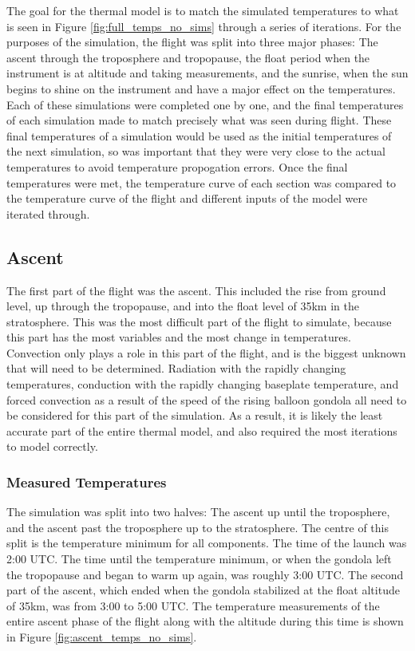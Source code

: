 The goal for the thermal model is to match the simulated temperatures to what is seen in Figure \ref{fig:full_temps_no_sims} through a series of iterations. For the purposes of the simulation, the flight was split into three major phases: The ascent through the troposphere and tropopause, the float period when the instrument is at altitude and taking measurements, and the sunrise, when the sun begins to shine on the instrument and have a major effect on the temperatures. Each of these simulations were completed one by one, and the final temperatures of each simulation made to match precisely what was seen during flight. These final temperatures of a simulation would be used as the initial temperatures of the next simulation, so was important that they were very close to the actual temperatures to avoid temperature propogation errors. Once the final temperatures were met, the temperature curve of each section was compared to the temperature curve of the flight and different inputs of the model were iterated through.

\subsection{Ascent}\label{ascent}
The first part of the flight was the ascent. This included the rise from ground level, up through the tropopause, and into the float level of 35km in the stratosphere. This was the most difficult part of the flight to simulate, because this part has the most variables and the most change in temperatures. Convection only plays a role in this part of the flight, and is the biggest unknown that will need to be determined. Radiation with the rapidly changing temperatures, conduction with the rapidly changing baseplate temperature, and forced convection as a result of the speed of the rising balloon gondola all need to be considered for this part of the simulation. As a result, it is likely the least accurate part of the entire thermal model, and also required the most iterations to model correctly.

\subsubsection{Measured Temperatures}
The simulation was split into two halves: The ascent up until the troposphere, and the ascent past the troposphere up to the stratosphere. The centre of this split is the temperature minimum for all components. The time of the launch was 2:00 UTC. The time until the temperature minimum, or when the gondola left the tropopause and began to warm up again, was roughly 3:00 UTC. The second part of the ascent, which ended when the gondola stabilized at the float altitude of 35km, was from 3:00 to 5:00 UTC. The temperature measurements of the entire ascent phase of the flight along with the altitude during this time is shown in Figure \ref{fig:ascent_temps_no_sims}.

